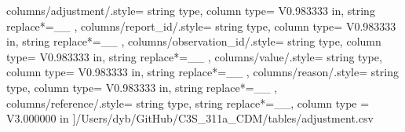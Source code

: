 \begin{landscape}
    columns/adjustment/.style={
            string type, 
            column type= V{0.983333 in}, 
            string replace*={_}{\_}
        },
    columns/report_id/.style={
            string type, 
            column type= V{0.983333 in}, 
            string replace*={_}{\_}
        },
    columns/observation_id/.style={
            string type, 
            column type= V{0.983333 in}, 
            string replace*={_}{\_}
        },
    columns/value/.style={
            string type, 
            column type= V{0.983333 in}, 
            string replace*={_}{\_}
        },
    columns/reason/.style={
            string type, 
            column type= V{0.983333 in}, 
            string replace*={_}{\_}
        },
    columns/reference/.style={
            string type, 
            string replace*={_}{\_},
            column type = V{3.000000 in}
        }
    ]{/Users/dyb/GitHub/C3S_311a_CDM/tables/adjustment.csv}
\end{landscape}
